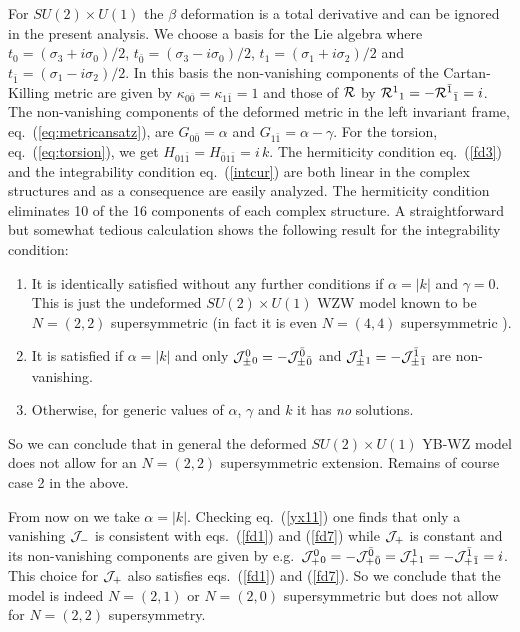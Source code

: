 \documentclass[12pt]{article}
\begin{document}
For $SU(2) \times U(1)$ the $\beta$ deformation is a total derivative and can be ignored in the present analysis. We choose a basis for the Lie algebra where $t_0=( \sigma _3+ i \sigma_0)/2$, $t_{\bar 0}=( \sigma _3- i \sigma_0)/2$, $t_1=( \sigma _1+ i \sigma_2)/2$ and $t_{\bar 1}=( \sigma _1- i \sigma_2)/2$. In this basis the non-vanishing components of the Cartan-Killing metric are given by $\kappa_{0\bar 0}= \kappa_{1\bar 1}=1$ and those of $ {\cal R}$ by $ {\cal R}^1{}_1=- {\cal R}^{\bar 1}{}_{\bar 1}=i$. The non-vanishing components of the deformed metric in the left invariant frame, eq.~(\ref{eq:metricansatz}), are $G_{0\bar 0}= \alpha $ and $G_{1\bar 1}= \alpha -\gamma $. For the torsion, eq.~(\ref{eq:torsion}), we get $H_{01\bar 1}=H_{\bar 0 1\bar 1}=i\,k$. The hermiticity condition eq.~(\ref{fd3}) and the integrability condition eq.~(\ref{intcur}) are both linear in the complex structures and as a consequence are easily analyzed. The hermiticity condition eliminates 10 of the 16 components of each complex structure. A straightforward but somewhat tedious calculation shows the following result for the integrability condition:
\begin{enumerate}
\item It is identically satisfied without any further conditions if $ \alpha =|k|$ and $\gamma =0$. This is just the undeformed $SU(2)\times U(1)$ WZW model known to be $N=(2,2)$ supersymmetric (in fact it is even $N=(4,4)$ supersymmetric ). 
\item It is satisfied if $\alpha =|k|$ and only ${\cal J}_\pm^0{}_0= - {\cal J}_\pm^{\bar 0}{}_{\bar 0}$ and  ${\cal J}_\pm^1{}_1= - {\cal J}_\pm^{\bar 1}{}_{\bar 1}$ are non-vanishing.
\item Otherwise, for generic values of $\alpha $, $ \gamma $ and $k$ it has {\em no} solutions. 
\end{enumerate}     
So we can conclude that in general the deformed $SU(2)\times U(1)$ YB-WZ model does not allow for an $N=(2,2)$ supersymmetric extension. Remains of course case 2 in the above. 

From now on we take $\alpha =|k|$. Checking eq.~(\ref{yx11}) one finds that only a vanishing $ {\cal J}_-$ is consistent with eqs.~(\ref{fd1}) and (\ref{fd7}) while $ {\cal J}_+$ is constant and its non-vanishing components are given by e.g.\ ${\cal J}_+^{0}{}_{0}=-{\cal J}_+^{\bar 0}{}_{\bar 0}={\cal J}_+^{1}{}_{1}=-{\cal J}_+^{\bar 1}{}_{\bar 1}=i$.  This choice for ${\cal J}_+$ also satisfies eqs.~(\ref{fd1}) and (\ref{fd7}). So we conclude that the model is indeed $N=(2,1)$ or $N=(2,0)$ supersymmetric but does not allow for $N=(2,2)$ supersymmetry. 
\end{document}
